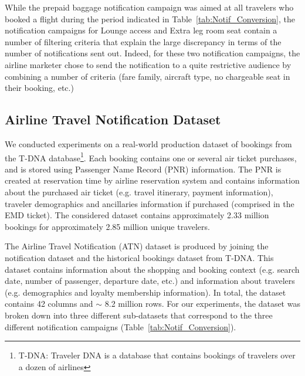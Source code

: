 \documentclass[11pt,dvipdfm]{article}
\begin{document}
While the prepaid baggage notification campaign was aimed at all travelers who booked a flight during the period indicated in Table~\ref{tab:Notif_Conversion}, the notification campaigns for Lounge access and Extra leg room seat contain a number of filtering criteria that explain the large discrepancy in terms of the number of notifications sent out. Indeed, for these two notification campaigns, the airline marketer chose to send the notification to a quite restrictive audience by combining a number of criteria (fare family, aircraft type, no chargeable seat in their booking, etc.)

\subsection{Airline Travel Notification Dataset}
\label{sec:dataset}
We conducted experiments on a real-world production dataset of bookings from the T-DNA database\footnote{T-DNA: Traveler DNA is a database that contains bookings of travelers over a dozen of airlines}. Each booking contains one or several air ticket purchases, and is stored using Passenger Name Record (PNR) information. The PNR is created at reservation time by airline reservation system and contains information about the purchased air ticket (e.g. travel itinerary, payment information), traveler demographics and ancillaries information if purchased (comprised in the EMD ticket). The considered dataset contains approximately 2.33 million bookings for approximately 2.85 million unique travelers.

The Airline Travel Notification (ATN) dataset is produced by joining the notification dataset and the historical bookings dataset from T-DNA. This dataset contains information about the shopping and booking context (e.g. search date, number of passenger, departure date, etc.) and information about travelers (e.g. demographics and loyalty membership information). In total, the dataset contains 42 columns and $\sim$ 8.2 million rows. For our experiments, the dataset was broken down into three different sub-datasets that correspond to the three different notification campaigns (Table~\ref{tab:Notif_Conversion}). 
\end{document}
